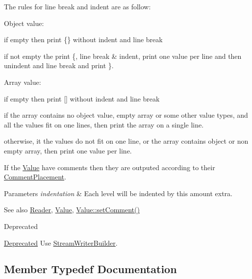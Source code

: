 The rules for line break and indent are as follow\+:
\begin{DoxyItemize}
\item Object value\+:
\begin{DoxyItemize}
\item if empty then print \{\} without indent and line break
\item if not empty the print \textquotesingle{}\{\textquotesingle{}, line break \& indent, print one value per line and then unindent and line break and print \textquotesingle{}\}\textquotesingle{}.
\end{DoxyItemize}
\item Array value\+:
\begin{DoxyItemize}
\item if empty then print \mbox{[}\mbox{]} without indent and line break
\item if the array contains no object value, empty array or some other value types, and all the values fit on one lines, then print the array on a single line.
\item otherwise, it the values do not fit on one line, or the array contains object or non empty array, then print one value per line.
\end{DoxyItemize}
\end{DoxyItemize}

If the \hyperlink{classJson_1_1Value}{Value} have comments then they are outputed according to their \hyperlink{namespaceJson_a4fc417c23905b2ae9e2c47d197a45351}{Comment\+Placement}.


\begin{DoxyParams}{Parameters}
{\em indentation} & Each level will be indented by this amount extra. \\
\hline
\end{DoxyParams}
\begin{DoxySeeAlso}{See also}
\hyperlink{classJson_1_1Reader}{Reader}, \hyperlink{classJson_1_1Value}{Value}, \hyperlink{classJson_1_1Value_a29f3a30f7e5d3af6f38d57999bf5b480}{Value\+::set\+Comment()} 
\end{DoxySeeAlso}
\begin{DoxyRefDesc}{Deprecated}
\item[\hyperlink{deprecated__deprecated000010}{Deprecated}]Use \hyperlink{classJson_1_1StreamWriterBuilder}{Stream\+Writer\+Builder}. \end{DoxyRefDesc}


\subsection{Member Typedef Documentation}
